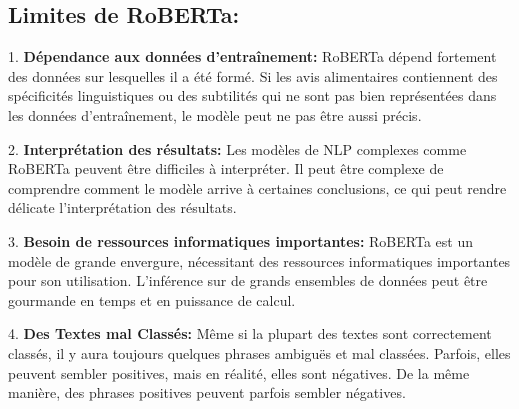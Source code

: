 \subsection{Limites de RoBERTa:}

1. \textbf{Dépendance aux données d'entraînement:} RoBERTa dépend fortement des données sur lesquelles il a été formé. Si les avis alimentaires contiennent des spécificités linguistiques ou des subtilités qui ne sont pas bien représentées dans les données d'entraînement, le modèle peut ne pas être aussi précis.

2. \textbf{Interprétation des résultats:} Les modèles de NLP complexes comme RoBERTa peuvent être difficiles à interpréter. Il peut être complexe de comprendre comment le modèle arrive à certaines conclusions, ce qui peut rendre délicate l'interprétation des résultats.

3. \textbf{Besoin de ressources informatiques importantes:} RoBERTa est un modèle de grande envergure, nécessitant des ressources informatiques importantes pour son utilisation. L'inférence sur de grands ensembles de données peut être gourmande en temps et en puissance de calcul.

4. \textbf{Des Textes mal Classés:}
Même si la plupart des textes sont correctement classés, il y aura toujours quelques phrases ambiguës et mal classées. Parfois, elles peuvent sembler positives, mais en réalité, elles sont négatives. De la même manière, des phrases positives peuvent parfois sembler négatives.
